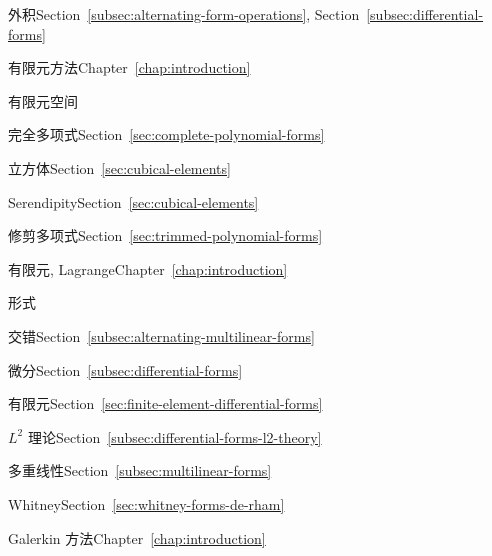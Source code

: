 \begin{theindex}
\item {}\label{index:exterior-product}{外积}\quad Section~\ref{subsec:alternating-form-operations}, Section~\ref{subsec:differential-forms}

\item {}\label{index:finite-element-method}{有限元方法}\quad Chapter~\ref{chap:introduction}

\item {}\label{index:finite-element-space}{有限元空间}

\subitem {}\label{index:finite-element-space-complete-polynomial}{完全多项式}\quad Section~\ref{sec:complete-polynomial-forms}

\subitem {}\label{index:finite-element-space-cubical}{立方体}\quad Section~\ref{sec:cubical-elements}

\subitem {}\label{index:finite-element-space-serendipity}{Serendipity}\quad Section~\ref{sec:cubical-elements}

\subitem {}\label{index:finite-element-space-trimmed-polynomial}{修剪多项式}\quad Section~\ref{sec:trimmed-polynomial-forms}

\item {}\label{index:finite-elements-lagrange}{有限元, Lagrange}\quad Chapter~\ref{chap:introduction}

\item {}\label{index:form}{形式}

\subitem {}\label{index:form-alternating}{交错}\quad Section~\ref{subsec:alternating-multilinear-forms}

\subitem {}\label{index:form-differential}{微分}\quad Section~\ref{subsec:differential-forms}

\subsubitem {}\label{index:form-differential-finite-element}{有限元}\quad Section~\ref{sec:finite-element-differential-forms}

\subsubitem {}\label{index:form-differential-l-2-theory}{$L^2$ 理论}\quad Section~\ref{subsec:differential-forms-l2-theory}

\subitem {}\label{index:form-multilinear}{多重线性}\quad Section~\ref{subsec:multilinear-forms}

\subitem {}\label{index:form-whitney}{Whitney}\quad Section~\ref{sec:whitney-forms-de-rham}

\item {}\label{index:galerkin-method}{Galerkin 方法}\quad Chapter~\ref{chap:introduction}


\end{theindex}
